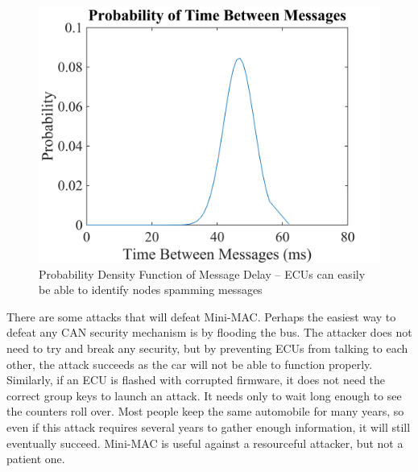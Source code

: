 	\selectfont
	\begin{figure}
		\centering
		\includegraphics[width=\columnwidth]{figures/pdf.png}
		\caption{{\selectfont Probability Density Function of Message Delay -- ECUs can easily be able to identify nodes spamming messages}}
	\end{figure}
	

There are some attacks that will defeat Mini-MAC. Perhaps the easiest way to defeat any CAN security mechanism is by flooding the bus. The attacker does not need to try and break any security, but by preventing ECUs from talking to each other, the attack succeeds as the car will not be able to function properly. Similarly, if an ECU is flashed with corrupted firmware, it does not need the correct group keys to launch an attack. It needs only to wait long enough to see the counters roll over. Most people keep the same automobile for many years, so even if this attack requires several years to gather enough information, it will still eventually succeed. Mini-MAC is useful against a resourceful attacker, but not a patient one.
